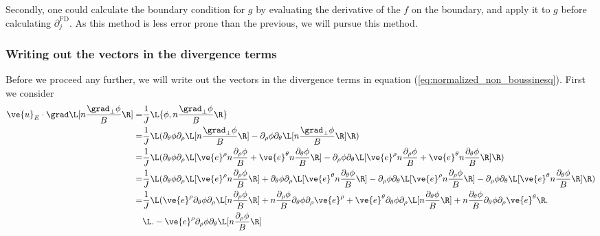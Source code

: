 Secondly, one could calculate the boundary condition for $g$ by evaluating the
derivative of the $f$ on the boundary, and apply it to $g$ before calculating
$\partial^{\text{FD}}_j$. As this method is less error prone than the previous,
we will pursue this method.

\subsubsection{Writing out the vectors in the divergence terms}
Before we proceed any further, we will write out the vectors in the divergence
terms in equation (\ref{eq:normalized_non_boussinesq}). First we consider
%
\begin{align*}
    \ve{u}_E\cdot\grad\L[n\frac{\grad_\perp\phi}{B}\R]
    =&
    \frac{1}{J}
    \L\{\phi, n\frac{\grad_\perp\phi}{B}\R\}
    \\
    =&
    \frac{1}{J}\L(
    \partial_\theta \phi \partial_\rho \L[n\frac{\grad_\perp\phi}{B}\R]
    -
    \partial_\rho \phi \partial_\theta \L[n\frac{\grad_\perp\phi}{B}\R]
    \R)
    \\
    =&
    \frac{1}{J}\L(
    \partial_\theta \phi \partial_\rho
    \L[\ve{e}^\rho n\frac{\partial_\rho \phi}{B}
    + \ve{e}^\theta n\frac{\partial_\theta \phi}{B}\R]
    -
    \partial_\rho \phi \partial_\theta
    \L[\ve{e}^\rho n\frac{\partial_\rho \phi}{B}
    + \ve{e}^\theta n\frac{\partial_\theta \phi}{B}\R]
    \R)
    \\
    =&
    \frac{1}{J}\L(
    \partial_\theta \phi \partial_\rho
    \L[ \ve{e}^\rho n\frac{\partial_\rho \phi}{B} \R]
    +
    \partial_\theta \phi \partial_\rho
    \L[ \ve{e}^\theta n\frac{\partial_\theta \phi}{B} \R]
    -
    \partial_\rho \phi \partial_\theta
    \L[ \ve{e}^\rho n\frac{\partial_\rho \phi}{B} \R]
    -
    \partial_\rho \phi \partial_\theta
    \L[ \ve{e}^\theta n\frac{\partial_\theta \phi}{B} \R]
    \R)
    \\
    =&
    \frac{1}{J}\L(
    \ve{e}^\rho \partial_\theta \phi \partial_\rho
    \L[ n\frac{\partial_\rho \phi}{B} \R]
    +
    n\frac{\partial_\rho \phi}{B}
    \partial_\theta \phi \partial_\rho \ve{e}^\rho
    +
    \ve{e}^\theta \partial_\theta \phi \partial_\rho
    \L[ n\frac{\partial_\theta \phi}{B} \R]
    +
    n\frac{\partial_\theta \phi}{B}
    \partial_\theta \phi \partial_\rho \ve{e}^\theta
    \R.
    \\&
    \L.
    -
    \ve{e}^\rho \partial_\rho \phi \partial_\theta
    \L[ n\frac{\partial_\rho \phi}{B} \R]

\end{align*}
